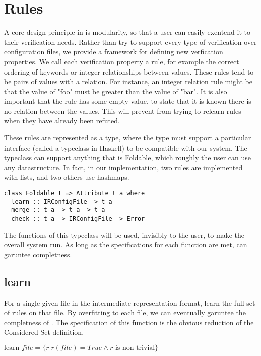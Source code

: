 \section{Rules}

A core design principle in \app is modularity, so that a user can easily exentend it to their verification needs.
Rather than try to support every type of verification over configuration files, we provide a framework for defining new verfication properties.
We call each verification property a rule, for example the correct ordering of keywords or integer relationships between values.
These rules tend to be pairs of values with a relation.
For instance, an integer relation rule might be that the value of "foo" must be greater than the value of "bar".
It is also important that the rule has some empty value, to state that it is known there is no relation between the values.
This will prevent \app from trying to relearn rules when they have already been refuted.

These rules are represented as a type, where the type must support a particular interface (called a typeclass in Haskell) to be compatible with our system.
The typeclass can support anything that is Foldable, which roughly the user can use any datastructure.
In fact, in our implementation, two rules are implemented with lists, and two others use hashmaps.

\begin{lstlisting}
class Foldable t => Attribute t a where
  learn :: IRConfigFile -> t a
  merge :: t a -> t a -> t a
  check :: t a -> IRConfigFile -> Error
\end{lstlisting} 

The functions of this typeclass will be used, invisibly to the user, to make the overall system run.
As long as the specifications for each function are met, \app can garuntee completness.

\subsection{learn}
  For a single given file in the intermediate representation format, learn the full set of rules on that file.
  By overfitting to each file, we can eventually garuntee the completness of \app.
  The specification of this function is the obvious reduction of the Considered Set definition.

  $\text{learn } file =  \{ r | r(file) = True \land r \text{ is non-trivial}\}$

